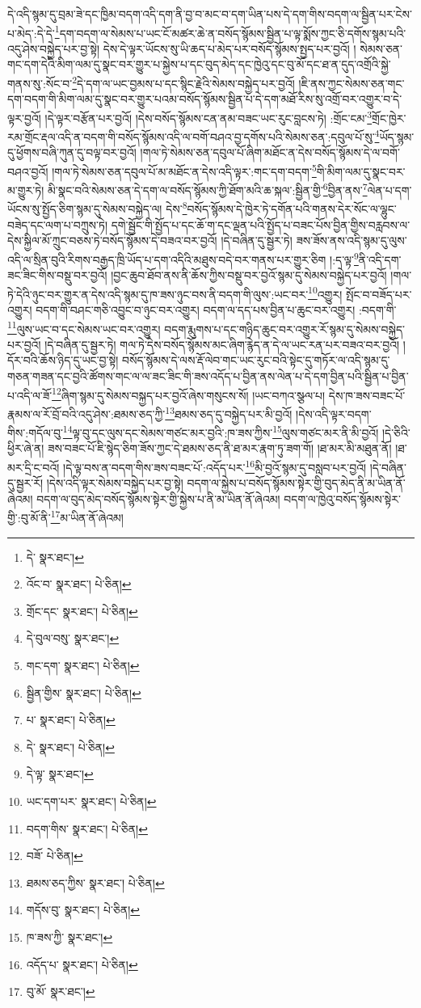 དེ་འདི་སྙམ་དུ་བྲམ་ཟེ་དང་ཁྱིམ་བདག་འདི་དག་ནི་བྱ་བ་མང་བ་དག་ཡིན་པས་དེ་དག་གིས་བདག་ལ་སྦྱིན་པར་ངེས་པ་མེད་:དེ་དེ་\footnote{དེ་  སྣར་ཐང་། }དག་བདག་ལ་སེམས་པ་ཡང་ངོ་མཚར་ཆེ་ན་བསོད་སྙོམས་སྦྱིན་པ་ལྟ་སྨོས་ཀྱང་ཅི་དགོས་སྙམ་པའི་འདུ་ཤེས་བསྐྱེད་པར་བྱ་སྟེ། དེས་དེ་ལྟར་ཡོངས་སུ་ཡི་ཆད་པ་མེད་པར་བསོད་སྙོམས་སྤྱད་པར་བྱའོ། །
སེམས་ཅན་གང་དག་དེའི་མིག་ལམ་དུ་སྣང་བར་གྱུར་པ་སྐྱེས་པ་དང་བུད་མེད་དང་ཁྱེའུ་དང་བུ་མོ་དང་ཐ་ན་དུད་འགྲོའི་སྐྱེ་གནས་སུ་:སོང་བ་\footnote{འོང་བ་  སྣར་ཐང་།  པེ་ཅིན། }དེ་དག་ལ་ཡང་བྱམས་པ་དང་སྙིང་རྗེའི་སེམས་བསྐྱེད་པར་བྱའོ། །ཇི་ནས་ཀྱང་སེམས་ཅན་གང་དག་བདག་གི་མིག་ལམ་དུ་སྣང་བར་གྱུར་པའམ་བསོད་སྙོམས་སྦྱིན་པ་དེ་དག་མཐོ་རིས་སུ་འགྲོ་བར་འགྱུར་བ་དེ་ལྟར་བྱའོ། །དེ་ལྟར་བརྩོན་པར་བྱའོ། །དེས་བསོད་སྙོམས་ངན་ནམ་བཟང་ཡང་རུང་བླངས་ཏེ། :གྲོང་ངམ་\footnote{གྲོང་དང་  སྣར་ཐང་།  པེ་ཅིན། }གྲོང་ཁྱེར་རམ་གྲོང་རྡལ་འདི་ན་བདག་གི་བསོད་སྙོམས་འདི་ལ་བགོ་བཤའ་བྱ་དགོས་པའི་སེམས་ཅན་:དབུལ་པོ་སུ་\footnote{དེ་བུལ་བསུ་  སྣར་ཐང་། }ཡོད་སྙམ་དུ་ཕྱོགས་བཞི་ཀུན་དུ་བལྟ་བར་བྱའོ། །གལ་ཏེ་སེམས་ཅན་དབུལ་པོ་ཞིག་མཐོང་ན་དེས་བསོད་སྙོམས་དེ་ལ་བགོ་བཤའ་བྱའོ། །གལ་ཏེ་སེམས་ཅན་དབུལ་པོ་མ་མཐོང་ན་དེས་འདི་ལྟར་:གང་དག་བདག་\footnote{གང་དག་  སྣར་ཐང་།  པེ་ཅིན། }གི་མིག་ལམ་དུ་སྣང་བར་མ་གྱུར་ཏེ། མི་སྣང་བའི་སེམས་ཅན་དེ་དག་ལ་བསོད་སྙོམས་ཀྱི་ཐོག་མའི་ཆ་སྐལ་:སྦྱིན་གྱི་\footnote{སྦྱིན་གྱིས་  སྣར་ཐང་།  པེ་ཅིན། }བྱིན་ནས་\footnote{པ་  སྣར་ཐང་།  པེ་ཅིན། }ལེན་པ་དག་ཡོངས་སུ་སྤྱོད་ཅིག་སྙམ་དུ་སེམས་བསྐྱེད་ལ། དེས་\footnote{དེ་  སྣར་ཐང་།  པེ་ཅིན། }བསོད་སྙོམས་དེ་ཁྱེར་ཏེ་དགོན་པའི་གནས་དེར་སོང་ལ་ལྷུང་བཟེད་དང་ལག་པ་བཀྲུས་ཏེ། དགེ་སྦྱོང་གི་སྤྱོད་པ་དང་ཆོ་ག་དང་ལྡན་པའི་སྤྱོད་པ་བཟང་པོས་བྱིན་གྱིས་བརླབས་ལ་དེས་སྐྱིལ་མོ་ཀྲུང་བཅས་ཏེ་བསོད་སྙོམས་དེ་བཟའ་བར་བྱའོ། །དེ་བཞིན་དུ་སྦྱར་ཏེ། ཟས་ཟོས་ནས་འདི་སྙམ་དུ་ལུས་འདི་ལ་སྲིན་བུའི་རིགས་བརྒྱད་ཁྲི་ཡོད་པ་དག་འདིའི་མཐུས་བདེ་བར་གནས་པར་གྱུར་ཅིག །:ད་ལྟ་\footnote{དེ་ལྟ་  སྣར་ཐང་། }ནི་འདི་དག་ཟང་ཟིང་གིས་བསྡུ་བར་བྱའོ། །བྱང་ཆུབ་ཐོབ་ནས་ནི་ཆོས་ཀྱིས་བསྡུ་བར་བྱའོ་སྙམ་དུ་སེམས་བསྐྱེད་པར་བྱའོ། །གལ་ཏེ་དེའི་ཉུང་བར་གྱུར་ན་དེས་འདི་སྙམ་དུ་ཁ་ཟས་ཉུང་བས་ནི་བདག་གི་ལུས་:ཡང་བར་\footnote{ཡང་དག་པར་  སྣར་ཐང་།  པེ་ཅིན། }འགྱུར། སྤོང་བ་བཟོད་པར་འགྱུར། བདག་གི་བཤང་གཅི་འབྱུང་བ་ཉུང་བར་འགྱུར། བདག་ལ་དད་པས་བྱིན་པ་ཆུང་བར་འགྱུར། :བདག་གི་\footnote{བདག་གིས་  སྣར་ཐང་།  པེ་ཅིན། }ལུས་ཡང་བ་དང་སེམས་ཡང་བར་འགྱུར། བདག་རྨུགས་པ་དང་གཉིད་ཆུང་བར་འགྱུར་རོ་སྙམ་དུ་སེམས་བསྐྱེད་པར་བྱའོ། །དེ་བཞིན་དུ་སྦྱར་ཏེ། གལ་ཏེ་དེས་བསོད་སྙོམས་མང་ཞིག་རྙེད་ན་དེ་ལ་ཡང་རན་པར་བཟའ་བར་བྱའོ། །དོར་བའི་ཆོས་ཉིད་དུ་ཡང་བྱ་སྟེ། བསོད་སྙོམས་དེ་ལས་རྡོ་ལེབ་གང་ཡང་རུང་བའི་སྟེང་དུ་གཏོར་ལ་འདི་སྙམ་དུ་གཅན་གཟན་དང་བྱའི་ཚོགས་གང་ལ་ལ་ཟང་ཟིང་གི་ཟས་འདོད་པ་བྱིན་ནས་ལེན་པ་དེ་དག་བྱིན་པའི་སྦྱིན་པ་བྱིན་པ་འདི་ལ་ཟོ་\footnote{བཟོ་  པེ་ཅིན། }ཞིག་སྙམ་དུ་སེམས་བསྐྱད་པར་བྱའོ་ཞེས་གསུངས་སོ། །ཡང་བཀའ་སྩལ་པ། དེས་ཁ་ཟས་བཟང་པོ་རྣམས་ལ་རོ་བྲོ་བའི་འདུ་ཤེས་:ཐམས་ཅད་ཀྱི་\footnote{ཐམས་ཅད་ཀྱིས་  སྣར་ཐང་།  པེ་ཅིན། }ཐམས་ཅད་དུ་བསྐྱེད་པར་མི་བྱའོ། །དེས་འདི་ལྟར་བདག་གིས་:གདོལ་བུ་\footnote{གདོས་བུ་  སྣར་ཐང་།  པེ་ཅིན། }ལྟ་བུ་དང་ལུས་དང་སེམས་གཙང་མར་བྱའི་:ཁ་ཟས་ཀྱིས་\footnote{ཁ་ཟས་ཀྱི་  སྣར་ཐང་། }ལུས་གཙང་མར་ནི་མི་བྱའོ། །དེ་ཅིའི་ཕྱིར་ཞེ་ན། ཟས་བཟང་པོ་ཇི་སྙེད་ཅིག་ཟོས་ཀྱང་དེ་ཐམས་ཅད་ནི་ཐ་མར་རྣག་ཏུ་ཟག་གོ། །ཐ་མར་མི་མཐུན་ནོ། །ཐ་མར་དྲི་ང་བའོ། །དེ་ལྟ་བས་ན་བདག་གིས་ཟས་བཟང་པོ་:འདོད་པར་\footnote{འདོད་པ་  སྣར་ཐང་།  པེ་ཅིན། }མི་བྱའོ་སྙམ་དུ་བསླབ་པར་བྱའོ། །དེ་བཞིན་དུ་སྦྱར་རོ། །དེས་འདི་ལྟར་སེམས་བསྐྱེད་པར་བྱ་སྟེ། བདག་ལ་སྐྱེས་པ་བསོད་སྙོམས་སྟེར་གྱི་བུད་མེད་ནི་མ་ཡིན་ནོ་ཞེའམ། བདག་ལ་བུད་མེད་བསོད་སྙོམས་སྟེར་གྱི་སྐྱེས་པ་ནི་མ་ཡིན་ནོ་ཞེའམ། བདག་ལ་ཁྱེའུ་བསོད་སྙོམས་སྟེར་གྱི་:བུ་མོ་ནི་\footnote{བུ་མོ་  སྣར་ཐང་། }མ་ཡིན་ནོ་ཞེའམ། 
